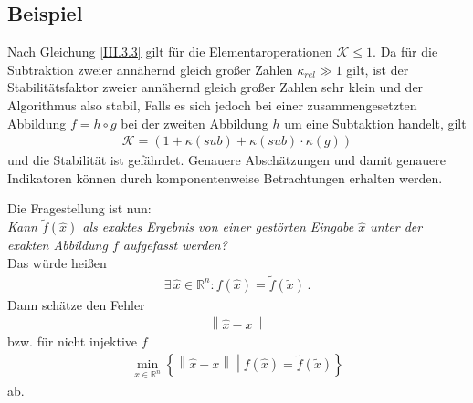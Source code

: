 \documentclass[ngerman,fontsize=11pt, paper=a4, parskip=half, titlepage=true, toc=bib]{scrbook}
\newcommand{\Ren}{\mathds{R}^{n}}
\newcommand{\K}{\mathcal{K}}
\newcommand{\nn}[1]{\left\| #1 \right\|}
\newcommand{\extrasection}[2]{\vspace{1.5eM}\minisec{\Large\itshape \thesection #1 #2}\vspace{1eM}}
\begin{document}
  \subsection{Beispiel}
  Nach Gleichung \eqref{III.3.3} gilt für die Elementaroperationen $\K\leq 1$.
  Da für die Subtraktion zweier annähernd gleich großer Zahlen $\kappa_{rel}\gg 1$ gilt,
  ist der Stabilitätsfaktor zweier annähernd gleich großer
  Zahlen sehr klein und der Algorithmus also stabil, Falls es sich jedoch bei einer zusammengesetzten Abbildung $f=h\circ g$  bei der zweiten Abbildung $h$ um eine Subtaktion handelt, gilt
  \begin{gather*}
    \K =(1+\kappa(sub)+\kappa(sub)\cdot\kappa(g))
  \end{gather*}
  und die Stabilität ist gefährdet.
  Genauere Abschätzungen und damit genauere Indikatoren können durch komponentenweise Betrachtungen erhalten werden.


  \extrasection{b)}{Rückwärtsanalyse} 
  Die Fragestellung ist nun: \\
  \textit{Kann $\widetilde{f}(\widehat{x})$ als exaktes Ergebnis von einer gestörten Eingabe $\widehat{x}$ unter der exakten Abbildung $f$ aufgefasst werden?}\\
  Das würde heißen
  \begin{gather*}
    \exists\, \widehat{x}\in \Ren: f(\widehat{x})= \widetilde{f}(\widetilde{x}) \, .
  \end{gather*}
  Dann schätze den Fehler 
  \begin{gather*} 
    \nn{\widehat{x}-x}
  \end{gather*}
  bzw. für nicht injektive $f$
  \begin{gather*}
    \min_{\widehat{x}\in \Ren}
    \left\{
      \nn{\widehat{x}-x} 
      \middle\vert f(\widehat{x}) = \widetilde{f}(\widetilde{x}) 
    \right\}
  \end{gather*} 
  ab. \\
  
  
\end{document}
